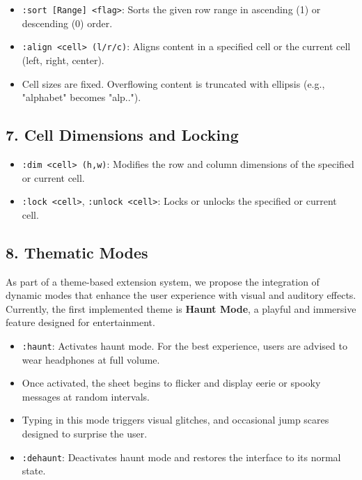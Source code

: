 \documentclass[a4paper,12pt]{article}
\begin{document}
\begin{itemize}[label={}]
  \item \texttt{:sort [Range] <flag>}: Sorts the given row range in ascending (1) or descending (0) order.
  \item \texttt{:align <cell> (l/r/c)}: Aligns content in a specified cell or the current cell (left, right, center).
  \item Cell sizes are fixed. Overflowing content is truncated with ellipsis (e.g., "alphabet" becomes "alp..").
\end{itemize}

\subsection*{7. Cell Dimensions and Locking}

\begin{itemize}[label={}]
  \item \texttt{:dim <cell> (h,w)}: Modifies the row and column dimensions of the specified or current cell.
  \item \texttt{:lock <cell>}, \texttt{:unlock <cell>}: Locks or unlocks the specified or current cell.
\end{itemize}

\subsection*{8. Thematic Modes}

As part of a theme-based extension system, we propose the integration of dynamic modes that enhance the user experience with visual and auditory effects. Currently, the first implemented theme is \textbf{Haunt Mode}, a playful and immersive feature designed for entertainment.

\begin{itemize}[label={}]
  \item \texttt{:haunt}: Activates haunt mode. For the best experience, users are advised to wear headphones at full volume.
  \item Once activated, the sheet begins to flicker and display eerie or spooky messages at random intervals.
  \item Typing in this mode triggers visual glitches, and occasional jump scares designed to surprise the user.
  \item \texttt{:dehaunt}: Deactivates haunt mode and restores the interface to its normal state.
\end{itemize}
\end{document}
